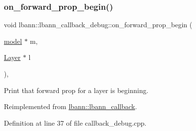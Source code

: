\subsubsection{\texorpdfstring{on\+\_\+forward\+\_\+prop\+\_\+begin()}{on\_forward\_prop\_begin()}}
{\footnotesize\ttfamily void lbann\+::lbann\+\_\+callback\+\_\+debug\+::on\+\_\+forward\+\_\+prop\+\_\+begin (\begin{DoxyParamCaption}\item[{\hyperlink{classlbann_1_1model}{model} $\ast$}]{m,  }\item[{\hyperlink{classlbann_1_1Layer}{Layer} $\ast$}]{l }\end{DoxyParamCaption})\hspace{0.3cm}{\ttfamily [override]}, {\ttfamily [virtual]}}

Print that forward prop for a layer is beginning. 

Reimplemented from \hyperlink{classlbann_1_1lbann__callback_ab96adb1d77180e00fdd668cd381323fd}{lbann\+::lbann\+\_\+callback}.



Definition at line 37 of file callback\+\_\+debug.\+cpp.


